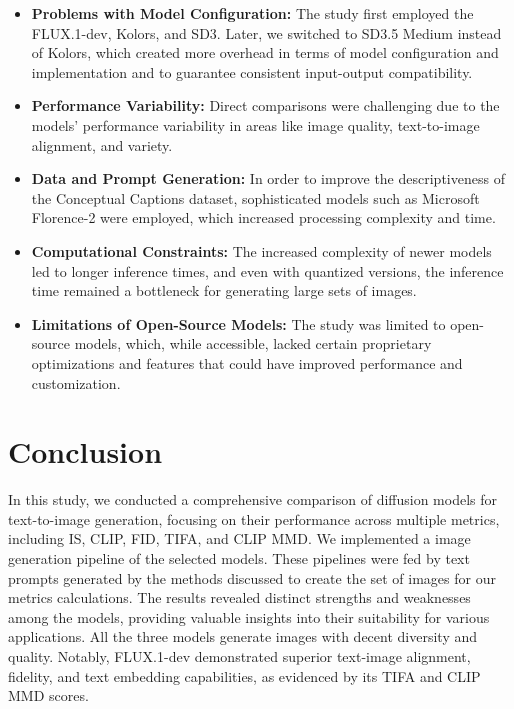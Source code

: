 \documentclass{article}
\begin{document}
\begin{itemize}
    \item \textbf{Problems with Model Configuration:} The study first employed the FLUX.1-dev, Kolors, and SD3. Later, we switched to SD3.5 Medium instead of Kolors, which created more overhead in terms of model configuration and implementation and to guarantee consistent input-output compatibility.
    
    \item \textbf{Performance Variability:} Direct comparisons were challenging due to the models’ performance variability in areas like image quality, text-to-image alignment, and variety.
    
    \item \textbf{Data and Prompt Generation:} In order to improve the descriptiveness of the Conceptual Captions dataset, sophisticated models such as Microsoft Florence-2 were employed, which increased processing complexity and time.
    
    \item \textbf{Computational Constraints:} The increased complexity of newer models led to longer inference times, and even with quantized versions, the inference time remained a bottleneck for generating large sets of images.
    
    \item \textbf{Limitations of Open-Source Models:} The study was limited to open-source models, which, while accessible, lacked certain proprietary optimizations and features that could have improved performance and customization.
\end{itemize}

\section{Conclusion}
In this study, we conducted a comprehensive comparison of diffusion models for text-to-image generation, focusing on their performance across multiple metrics, including IS, CLIP, FID, TIFA, and CLIP MMD. We implemented a image generation pipeline of the selected models. These pipelines were fed by text prompts generated by the methods discussed to create the set of images for our metrics calculations. The results revealed distinct strengths and weaknesses among the models, providing valuable insights into their suitability for various applications. All the three models generate images with decent diversity and quality. Notably, FLUX.1-dev demonstrated superior text-image alignment, fidelity, and text embedding capabilities, as evidenced by its TIFA and CLIP MMD scores. 

\newpage

  
  
\end{document}
